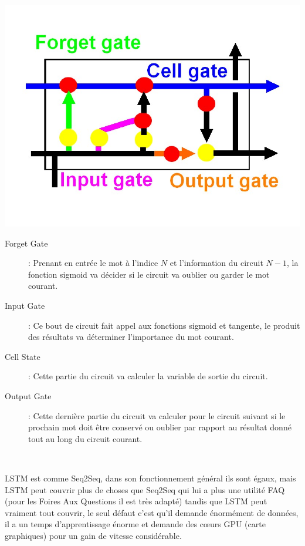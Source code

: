 \includegraphics[scale=0.4]{img/lstm.jpg} 

\begin{description}
\item[Forget Gate]: Prenant en entrée le mot à l'indice $N$ et l'information du circuit $N-1$, 
la fonction sigmoid va décider si le circuit va oublier ou garder le mot courant. 
\item[Input Gate]: Ce bout de circuit fait appel aux fonctions sigmoid et tangente, le produit des résultats va déterminer l'importance du mot courant.
\item[Cell State]: Cette partie du circuit va calculer la variable de sortie du circuit.
\item[Output Gate]: Cette dernière partie du circuit va calculer pour le circuit suivant si le prochain mot doit être conservé ou oublier par rapport au résultat donné tout au long du circuit courant.
\end{description}
\ \linebreak

LSTM est comme Seq2Seq, dans son fonctionnement général ils sont égaux, mais LSTM peut couvrir plus de choses que Seq2Seq qui lui a plus une utilité FAQ (pour les Foires Aux Questions il est très adapté) tandis que LSTM peut vraiment tout couvrir, le seul défaut c'est qu'il demande énormément de données, il a un temps d'apprentissage énorme et demande des cœurs GPU (carte graphiques) pour un gain de vitesse considérable.\\
\pagebreak

